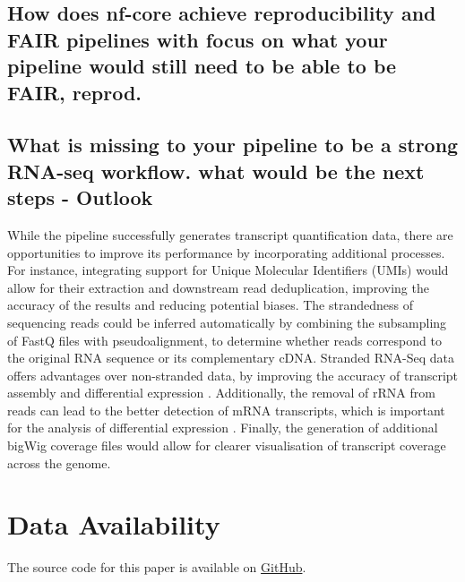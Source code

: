 \documentclass{article}
\theoremstyle{plain}
\theoremstyle{definition}
\theoremstyle{remark}
\begin{document}
\subsection{How does nf-core achieve reproducibility and FAIR pipelines with focus on what your pipeline would still need to be able to be FAIR, reprod.}
\subsection{What is missing to your pipeline to be a strong RNA-seq workflow. what would be the next steps - Outlook}
While the pipeline successfully generates transcript quantification data, there are opportunities to improve its performance by incorporating additional processes. For instance, integrating support for Unique Molecular Identifiers (UMIs) would allow for their extraction and downstream read deduplication, improving the accuracy of the results and reducing potential biases. The strandedness of sequencing reads could be inferred automatically by combining the subsampling of FastQ files with pseudoalignment, to determine whether reads correspond to the original RNA sequence or its complementary cDNA. Stranded RNA-Seq data offers advantages over non-stranded data, by improving the accuracy of transcript assembly and differential expression \cite{Signal2022}. Additionally, the removal of rRNA from reads can lead to the better detection of mRNA transcripts, which is important for the analysis of differential expression \cite{Pastor2022}. Finally, the generation of additional bigWig coverage files would allow for clearer visualisation of transcript coverage across the genome.

\section*{Data Availability}
The source code for this paper is available on \href{{https://github.com/JuliaGraf/RNAseq}}{GitHub}.



\end{document}
